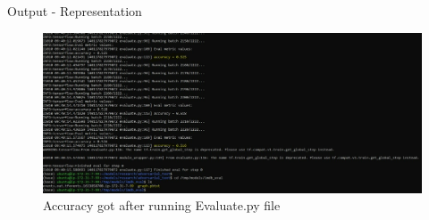 \documentclass[aspectratio=169,xcolor=dvipsnames]{beamer}
\begin{document}


\begin{frame}{Output - Representation}
    \tableofcontents

 
  \begin{figure}
   \includegraphics[width=430]{Accuracy_evaluation.jpg}
      \caption{Accuracy got after running Evaluate.py file}
\end{figure}


\end{frame}




\end{document}
